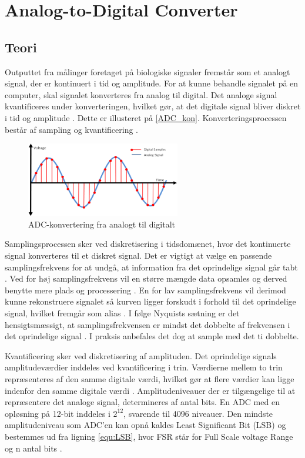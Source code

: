 \section{Analog-to-Digital Converter}
\subsection{Teori}

Outputtet fra målinger foretaget på biologiske signaler fremstår som et analogt signal, der er kontinuert i tid og amplitude. For at kunne behandle signalet på en computer, skal signalet konverteres fra analog til digital. Det analoge signal kvantificeres under konverteringen, hvilket gør, at det digitale signal bliver diskret i tid og amplitude \citep{webster1998}. Dette er illusteret på \autoref{ADC_kon}. Konverteringsprocessen består af sampling og kvantificering \citep{morre2003}. 

\begin{figure}[H]
\centering
\includegraphics[width=0.6\textwidth]{figures/problemloesning/adc}
\caption{ADC-konvertering fra analogt til digitalt}
\label{fig:ADC_kon}
\end{figure}

Samplingsprocessen sker ved diskretisering i tidsdomænet, hvor det kontinuerte signal konverteres til et diskret signal. Det er vigtigt at vælge en passende samplingsfrekvens for at undgå, at information fra det oprindelige signal går tabt \citep{morre2003}. Ved for høj samplingsfrekvens vil en større mængde data opsamles og derved benytte mere plads og processering \citep{wolf2004}. En for lav samplingsfrekvens vil derimod kunne rekonstruere signalet så kurven ligger forskudt i forhold til det oprindelige signal, hvilket fremgår som alias \citep{morre2003}. I følge Nyquists sætning er det hensigtsmæssigt, at samplingsfrekvensen er mindst det dobbelte af frekvensen i det oprindelige signal \citep{morre2003}. I praksis anbefales det dog at sample med det ti dobbelte.

Kvantificering sker ved diskretisering af amplituden. Det oprindelige signals amplitudeværdier inddeles ved kvantificering i trin. Værdierne mellem to trin repræsenteres af den samme digitale værdi, hvilket gør at flere værdier kan ligge indenfor den samme digitale værdi \citep{morre2003}. Amplitudeniveauer der er tilgængelige til at repræsentere det analoge signal, determineres af antal bits. En ADC med en opløsning på 12-bit inddeles i ${2}^{12}$, svarende til 4096 niveauer. Den mindste amplitudeniveau som ADC'en kan opnå kaldes Least Significant Bit (LSB) og bestemmes ud fra ligning \autoref{equ:LSB}, hvor FSR står for Full Scale voltage Range og n antal bits \citep{webster1998, wolf2004}.

